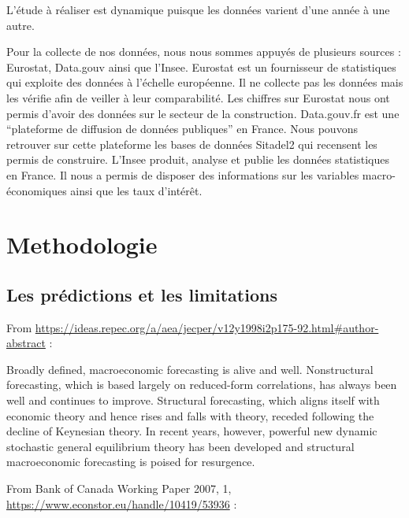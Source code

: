 \documentclass[11pt,]{article}
\begin{document}
L'étude à réaliser est dynamique puisque les données varient d'une année
à une autre.

Pour la collecte de nos données, nous nous sommes appuyés de plusieurs
sources : Eurostat, Data.gouv ainsi que l'Insee. Eurostat est un
fournisseur de statistiques qui exploite des données à l'échelle
européenne. Il ne collecte pas les données mais les vérifie afin de
veiller à leur comparabilité. Les chiffres sur Eurostat nous ont permis
d'avoir des données sur le secteur de la construction. Data.gouv.fr est
une ``plateforme de diffusion de données publiques'' en France. Nous
pouvons retrouver sur cette plateforme les bases de données Sitadel2 qui
recensent les permis de construire. L'Insee produit, analyse et publie
les données statistiques en France. Il nous a permis de disposer des
informations sur les variables macro-économiques ainsi que les taux
d'intérêt.

\hypertarget{methodologie}{%
\section{Methodologie}\label{methodologie}}

\hypertarget{les-predictions-et-les-limitations}{%
\subsection{Les prédictions et les
limitations}\label{les-predictions-et-les-limitations}}

From
\url{https://ideas.repec.org/a/aea/jecper/v12y1998i2p175-92.html\#author-abstract}
:

Broadly defined, macroeconomic forecasting is alive and well.
Nonstructural forecasting, which is based largely on reduced-form
correlations, has always been well and continues to improve. Structural
forecasting, which aligns itself with economic theory and hence rises
and falls with theory, receded following the decline of Keynesian
theory. In recent years, however, powerful new dynamic stochastic
general equilibrium theory has been developed and structural
macroeconomic forecasting is poised for resurgence.

From Bank of Canada Working Paper 2007, 1,
\url{https://www.econstor.eu/handle/10419/53936} :
\end{document}
